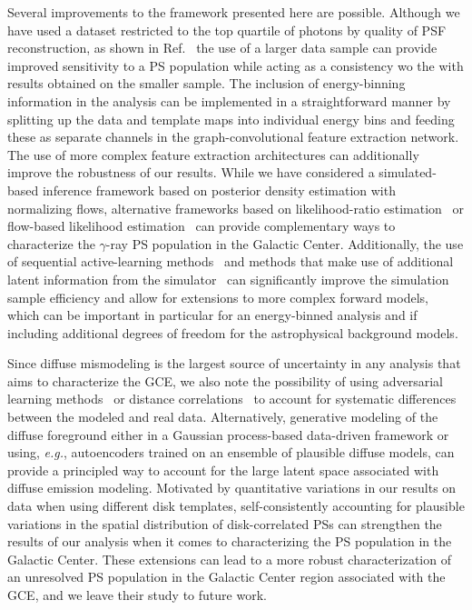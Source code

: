 \documentclass[prd,aps,10pt,nofootinbib,twocolumn,superscriptaddress,preprintnumbers,balancelastpage,longbibliography,floatfix]{revtex4-2}
\begin{document}
Several improvements to the framework presented here are possible. Although we have used a dataset restricted to the top quartile of photons by quality of PSF reconstruction, as shown in Ref.~\cite{Leane:2020pfc} the use of a larger data sample can provide improved sensitivity to a PS population while acting as a consistency wo the with results obtained on the smaller sample. The inclusion of energy-binning information in the analysis can be implemented in a straightforward manner by splitting up the data and template maps into individual energy bins and feeding these as separate channels in the graph-convolutional feature extraction network. The use of more complex feature extraction architectures can additionally improve the robustness of our results. 
While we have considered a simulated-based inference framework based on posterior density estimation with normalizing flows, alternative frameworks based on likelihood-ratio estimation~\cite{Brehmer:2018eca,Brehmer:2018hga,Brehmer:2018kdj,Cranmer:2015bka, Hermans:2019ioj,Miller:2020hua,Miller:2021hys} or flow-based likelihood estimation~\cite{2019arXiv191200042W,pmlr-v89-papamakarios19a} can provide complementary ways to characterize the $\gamma$-ray PS population in the Galactic Center. Additionally, the use of sequential active-learning methods~\cite{pmlr-v89-papamakarios19a} and methods that make use of additional latent information from the simulator~\cite{Brehmer:2018eca,Brehmer:2018hga,Brehmer:2018kdj,Brehmer:2019xox,Stoye:2018ovl} can significantly improve the simulation sample efficiency and allow for extensions to more complex forward models, which can be important in particular for an energy-binned analysis and if including additional degrees of freedom for the astrophysical background models. 

Since diffuse mismodeling is the largest source of uncertainty in any analysis that aims to characterize the GCE, we also note the possibility of using adversarial learning methods~\cite{Louppe:2016ylz} or distance correlations~\cite{Kasieczka:2020yyl} to account for systematic differences between the modeled and real \Fermi data. Alternatively, generative modeling of the diffuse foreground either in a Gaussian process-based data-driven framework or using, \emph{e.g.}, autoencoders trained on an ensemble of plausible diffuse models, can provide a principled way to account for the large latent space associated with diffuse emission modeling. Motivated by quantitative variations in our results on \Fermi data when using different disk templates, self-consistently accounting for plausible variations in the spatial distribution of disk-correlated PSs can strengthen the results of our analysis when it comes to characterizing the PS population in the Galactic Center. 
These extensions can lead to a more robust characterization of an unresolved PS population in the Galactic Center region associated with the GCE, and we leave their study to future work.
\end{document}
